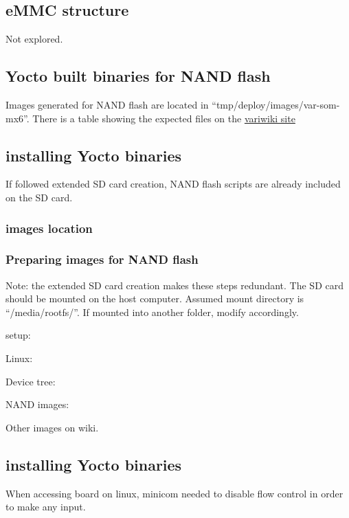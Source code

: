 \documentclass[10pt]{article}
\begin{document}
\subsection{eMMC structure}
Not explored.

\subsection{Yocto built binaries for NAND flash}
Images generated for NAND flash are located in ``tmp/deploy/images/var-som-mx6''. There is a table showing the expected files on the
\href{http://variwiki.com/index.php?title=Yocto\_NAND\_Flash\_Burning&release=RELEASE\_SUMO\_V1.1\_VAR-SOM-MX6#Yocto\_Built\_binaries\_for\_NAND\_flash\_.2F\_eMMC}{variwiki site}

\subsection{installing Yocto binaries}
If followed extended SD card creation, NAND flash scripts are already included on the SD card.

\subsubsection{images location}


\subsubsection{Preparing images for NAND flash}
Note: the extended SD card creation makes these steps redundant.
The SD card should be mounted on the host computer. Assumed mount directory is ``/media/rootfs/''. If mounted into another folder, modify accordingly.\

setup:

Linux:

Device tree:

NAND images:


Other images on wiki.

\subsection{installing Yocto binaries}
When accessing board on linux, minicom needed to disable flow control in order to make any input.
\end{document}
